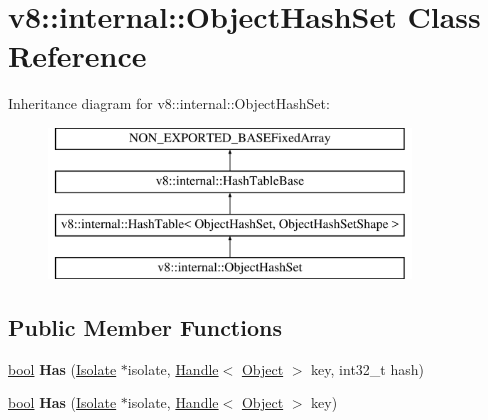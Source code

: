 \hypertarget{classv8_1_1internal_1_1ObjectHashSet}{}\section{v8\+:\+:internal\+:\+:Object\+Hash\+Set Class Reference}
\label{classv8_1_1internal_1_1ObjectHashSet}
Inheritance diagram for v8\+:\+:internal\+:\+:Object\+Hash\+Set\+:\begin{figure}[H]
\begin{center}
\leavevmode
\includegraphics[height=4.000000cm]{classv8_1_1internal_1_1ObjectHashSet}
\end{center}
\end{figure}
\subsection*{Public Member Functions}
\begin{DoxyCompactItemize}
\item 
\mbox{\label{classv8_1_1internal_1_1ObjectHashSet_a45996bafc9606c00273639565daeeb99}} 
\mbox{\hyperlink{classbool}{bool}} {\bfseries Has} (\mbox{\hyperlink{classv8_1_1internal_1_1Isolate}{Isolate}} $\ast$isolate, \mbox{\hyperlink{classv8_1_1internal_1_1Handle}{Handle}}$<$ \mbox{\hyperlink{classv8_1_1internal_1_1Object}{Object}} $>$ key, int32\+\_\+t hash)
\item 
\mbox{\label{classv8_1_1internal_1_1ObjectHashSet_a0d8358724fb2daf2334432bc2c4f2c4d}} 
\mbox{\hyperlink{classbool}{bool}} {\bfseries Has} (\mbox{\hyperlink{classv8_1_1internal_1_1Isolate}{Isolate}} $\ast$isolate, \mbox{\hyperlink{classv8_1_1internal_1_1Handle}{Handle}}$<$ \mbox{\hyperlink{classv8_1_1internal_1_1Object}{Object}} $>$ key)
\end{DoxyCompactItemize}
